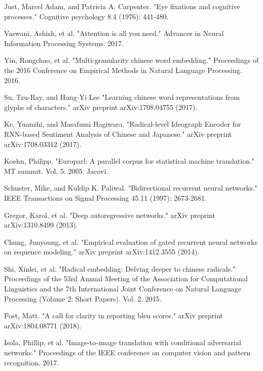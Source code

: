 \documentclass{article}
\begin{document}


\begin{thebibliography}{1}

Just, Marcel Adam, and Patricia A. Carpenter. 
\newblock"Eye fixations and cognitive processes." Cognitive psychology 8.4 (1976): 441-480.

Vaswani, Ashish, et al. 
\newblock"Attention is all you need." Advances in Neural Information Processing Systems. 2017.

Yin, Rongchao, et al.
\newblock "Multi-granularity chinese word embedding." Proceedings of the 2016 Conference on Empirical Methods in Natural Language Processing. 2016.

Su, Tzu-Ray, and Hung-Yi Lee
\newblock "Learning chinese word representations from glyphs of characters." arXiv preprint arXiv:1708.04755 (2017).

Ke, Yuanzhi, and Masafumi Hagiwara. 
\newblock"Radical-level Ideograph Encoder for RNN-based Sentiment Analysis of Chinese and Japanese." arXiv preprint arXiv:1708.03312 (2017).

Koehn, Philipp. 
\newblock "Europarl: A parallel corpus for statistical machine translation." MT summit. Vol. 5. 2005.  Jacovi.

Schuster, Mike, and Kuldip K. Paliwal. 
\newblock "Bidirectional recurrent neural networks." IEEE Transactions on Signal Processing 45.11 (1997): 2673-2681.

Gregor, Karol, et al. 
\newblock "Deep autoregressive networks." arXiv preprint arXiv:1310.8499 (2013).

Chung, Junyoung, et al. 
\newblock"Empirical evaluation of gated recurrent neural networks on sequence modeling." arXiv preprint arXiv:1412.3555 (2014).

Shi, Xinlei, et al. 
\newblock"Radical embedding: Delving deeper to chinese radicals." Proceedings of the 53rd Annual Meeting of the Association for Computational Linguistics and the 7th International Joint Conference on Natural Language Processing (Volume 2: Short Papers). Vol. 2. 2015.

Post, Matt. 
\newblock"A call for clarity in reporting bleu scores." arXiv preprint arXiv:1804.08771 (2018).

Isola, Phillip, et al. 
\newblock "Image-to-image translation with conditional adversarial networks." Proceedings of the IEEE conference on computer vision and pattern recognition. 2017.

\end{thebibliography}
\end{document}

